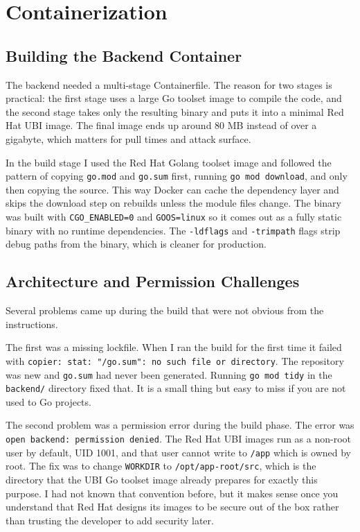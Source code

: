 \section{Containerization}

\subsection{Building the Backend Container}

The backend needed a multi-stage Containerfile. The reason for two stages is practical:
the first stage uses a large Go toolset image to compile the code, and the second stage
takes only the resulting binary and puts it into a minimal Red Hat UBI image. The final
image ends up around 80 MB instead of over a gigabyte, which matters for pull times and
attack surface.

In the build stage I used the Red Hat Golang toolset image and followed the pattern of
copying \texttt{go.mod} and \texttt{go.sum} first, running \texttt{go mod download}, and
only then copying the source. This way Docker can cache the dependency layer and skips
the download step on rebuilds unless the module files change. The binary was built with
\texttt{CGO\_ENABLED=0} and \texttt{GOOS=linux} so it comes out as a fully static
binary with no runtime dependencies. The \texttt{-ldflags} and \texttt{-trimpath} flags
strip debug paths from the binary, which is cleaner for production.

\subsection{Architecture and Permission Challenges}

Several problems came up during the build that were not obvious from the instructions.

The first was a missing lockfile. When I ran the build for the first time it failed with
\texttt{copier: stat: "/go.sum": no such file or directory}. The repository was new and
\texttt{go.sum} had never been generated. Running \texttt{go mod tidy} in the
\texttt{backend/} directory fixed that. It is a small thing but easy to miss if you are
not used to Go projects.

The second problem was a permission error during the build phase. The error was
\texttt{open backend: permission denied}. The Red Hat UBI images run as a non-root user
by default, UID 1001, and that user cannot write to \texttt{/app} which is owned by root.
The fix was to change \texttt{WORKDIR} to \texttt{/opt/app-root/src}, which is the
directory that the UBI Go toolset image already prepares for exactly this purpose. I had
not known that convention before, but it makes sense once you understand that Red Hat
designs its images to be secure out of the box rather than trusting the developer to add
security later.

